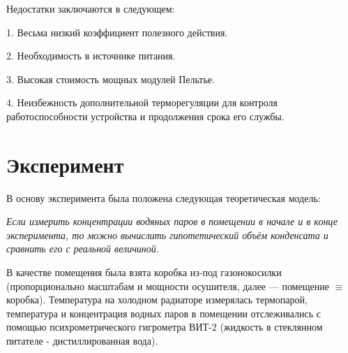\documentclass[a4paper,12pt]{article} %
\begin{document}
\vspace{5mm}

Недостатки заключаются в следующем:

\hspace{5mm}
1. Весьма низкий коэффициент полезного действия.

\hspace{5mm}
2. Необходимость в источнике питания.

\hspace{5mm}
3. Высокая стоимость мощных модулей Пельтье.

\hspace{5mm}
4. Неизбежность дополнительной терморегуляции для контроля работоспособности устройства и продолжения срока его службы.


\newpage


\section{Эксперимент}

В основу эксперимента была положена следующая теоретическая модель: 

\vspace{2mm}
{\it Если измерить концентрации водяных паров в помещении в начале и в конце эксперимента, то можно вычислить гипотетический объём конденсата и сравнить его с реальной величиной.}

\vspace{2mm}
В качестве помещения была взята коробка из-под газонокосилки (пропорционально масштабам и мощности осушителя, далее --- помещение $\equiv$ коробка). Температура на холодном радиаторе измерялась термопарой, температура и концентрация водных паров в помещении отслеживались с помощью психрометрического гигрометра ВИТ-2 (жидкость в стеклянном питателе - дистиллированная вода).
\end{document}
